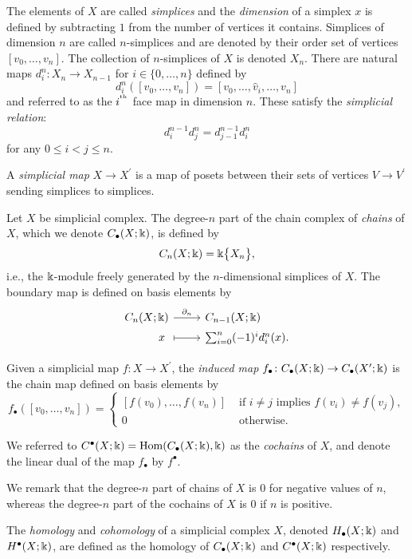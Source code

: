 The elements of $X$ are called \textit{simplices} and the \textit{dimension} of a simplex $x$ is defined by subtracting $1$ from the number of vertices it contains.
Simplices of dimension $n$ are called $n$-simplices and are denoted by their order set of vertices $[v_0, \dots, v_n]$.
The collection of $n$-simplices of $X$ is denoted $X_n$.
There are natural maps $d_i^n \colon X_n \to X_{n-1}$ for $i \in \{0, \dots, n\}$ defined by
\begin{equation*}
d_i^n([v_0, \dots, v_n]) = [v_0, \dots, \widehat{v}_i, \dots, v_n]
\end{equation*}
and referred to as the $i^{^\mathrm{th}}$ face map in dimension $n$.
These satisfy the \textit{simplicial relation}:
\begin{equation} \label{e:simplicial relation}
d_i^{n-1} d^n_j = d_{j-1}^{n-1} d_i^n
\end{equation}
for any $0 \leq i < j \leq n$.

A \textit{simplicial map} $X \to X^\prime$ is a map of posets between their sets of vertices $V \to V^\prime$ sending simplices to simplices.

Let $X$ be simplicial complex.
The degree-$n$ part of the chain complex of \textit{chains} of $X$, which we denote $C_\bullet(X; \Bbbk)$, is defined by
\begin{equation*}
C_n(X; \Bbbk) = \Bbbk \big\{ X_n \big\},
\end{equation*}
i.e., the $\Bbbk$-module freely generated by the $n$-dimensional simplices of $X$.
The boundary map is defined on basis elements by
\begin{equation*}
\begin{tikzcd}[column sep=normal, row sep=tiny,row sep = 0ex
,/tikz/column 1/.append style={anchor=base east}
,/tikz/column 2/.append style={anchor=base west}
]
C_n(X; \k) \arrow[r, "\partial_n"] & C_{n-1}(X; \k) \\
x\ \arrow[r, |->] & \sum_{i=0}^{n} (-1)^i d_i^n (x).
\end{tikzcd}
\end{equation*}

Given a simplicial map $f \colon X \to X^\prime$, the \textit{induced map} $f_\bullet \colon C_\bullet(X; \Bbbk) \to C_\bullet(X^\prime; \Bbbk)$ is the chain map defined on basis elements by
\begin{equation*}
f_\bullet([v_0, \dots, v_n]) =
\begin{cases}
[f(v_0), \dots, f(v_n)] & \text{ if } i \neq j \text{ implies } f(v_i) \neq f(v_j), \\
0 & \text{ otherwise}.
\end{cases}
\end{equation*}

We referred to $C^\bullet(X; \Bbbk) = \mathrm{Hom}(C_\bullet(X; \Bbbk), \Bbbk)$ as the \textit{cochains} of $X$, and denote the linear dual of the map $f_\bullet$ by $f^\bullet$.

We remark that the degree-$n$ part of chains of $X$ is $0$ for negative values of $n$, whereas the degree-$n$ part of the cochains of $X$ is $0$ if $n$ is positive.

The \textit{homology} and \textit{cohomology} of a simplicial complex $X$, denoted $H_\bullet(X; \Bbbk)$ and $H^\bullet(X; \Bbbk)$, are defined as the homology of $C_\bullet(X; \Bbbk)$ and $C^\bullet(X; \Bbbk)$ respectively.